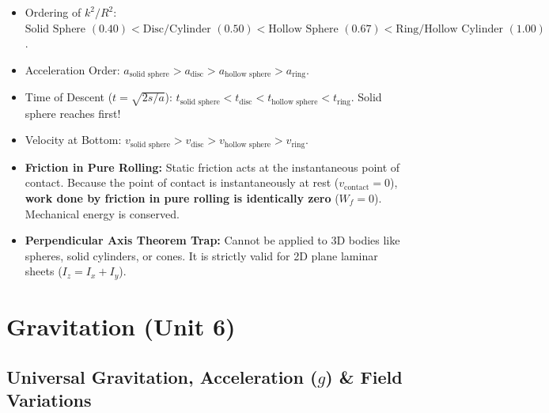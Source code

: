 \documentclass[10pt,twoside,openright]{book}
\begin{document}
\begin{usecasebox}
\begin{itemize}
  \item Ordering of $k^2/R^2$: $\text{Solid Sphere } (0.40) < \text{Disc/Cylinder } (0.50) < \text{Hollow Sphere } (0.67) < \text{Ring/Hollow Cylinder } (1.00)$.
  \item Acceleration Order: $a_{\text{solid sphere}} > a_{\text{disc}} > a_{\text{hollow sphere}} > a_{\text{ring}}$.
  \item Time of Descent ($t = \sqrt{2s/a}$): $t_{\text{solid sphere}} < t_{\text{disc}} < t_{\text{hollow sphere}} < t_{\text{ring}}$. Solid sphere reaches first!
  \item Velocity at Bottom: $v_{\text{solid sphere}} > v_{\text{disc}} > v_{\text{hollow sphere}} > v_{\text{ring}}$.
\end{itemize}
\end{usecasebox}

\begin{trapbox}
\begin{itemize}
  \item \textbf{Friction in Pure Rolling:} Static friction acts at the instantaneous point of contact. Because the point of contact is instantaneously at rest ($v_{\text{contact}} = 0$), \textbf{work done by friction in pure rolling is identically zero} ($W_f = 0$). Mechanical energy is conserved.
  \item \textbf{Perpendicular Axis Theorem Trap:} Cannot be applied to 3D bodies like spheres, solid cylinders, or cones. It is strictly valid for 2D plane laminar sheets ($I_z = I_x + I_y$).
\end{itemize}
\end{trapbox}

\newpage

\section{Gravitation (Unit 6)}

\subsection{Universal Gravitation, Acceleration ($g$) \& Field Variations}
\end{document}
